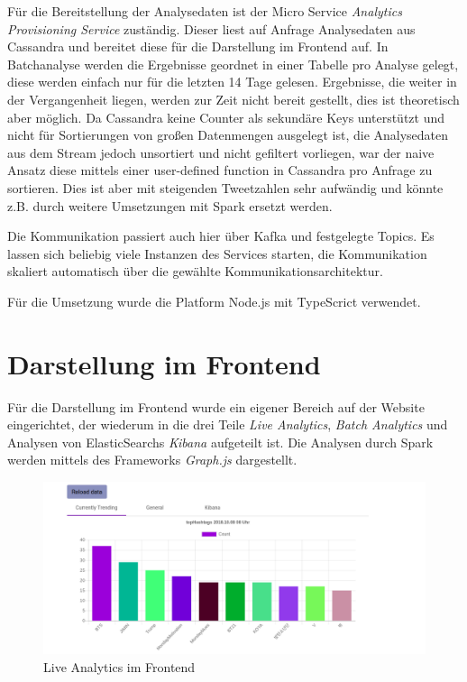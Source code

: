 Für die Bereitstellung der Analysedaten ist der Micro Service \textit{Analytics Provisioning Service} zuständig. 
Dieser liest auf Anfrage Analysedaten aus Cassandra und bereitet diese für die Darstellung im Frontend auf.
In Batchanalyse werden die Ergebnisse geordnet in einer Tabelle pro Analyse gelegt, diese werden einfach nur für die letzten 14 Tage gelesen. Ergebnisse, die weiter in der Vergangenheit liegen, werden zur Zeit nicht bereit gestellt, dies ist theoretisch aber möglich.
Da Cassandra keine Counter als sekundäre Keys unterstützt und nicht für Sortierungen von großen Datenmengen ausgelegt ist,
die Analysedaten aus dem Stream jedoch unsortiert und nicht gefiltert vorliegen, war der naive Ansatz diese mittels einer  user-defined function in Cassandra pro Anfrage zu sortieren. Dies ist aber mit steigenden Tweetzahlen sehr aufwändig und könnte z.B. durch weitere Umsetzungen mit Spark ersetzt werden.

Die Kommunikation passiert auch hier über Kafka und festgelegte Topics.
Es lassen sich beliebig viele Instanzen des Services starten, die Kommunikation skaliert automatisch über die gewählte Kommunikationsarchitektur.

Für die Umsetzung wurde die Platform Node.js mit TypeScrict verwendet. 


\section{Darstellung im Frontend}

Für die Darstellung im Frontend wurde ein eigener Bereich auf der Website eingerichtet, der wiederum in die drei Teile
\textit{Live Analytics}, \textit{Batch Analytics} und Analysen von ElasticSearchs \textit{Kibana} aufgeteilt ist.
Die Analysen durch Spark werden mittels des Frameworks \textit{Graph.js} dargestellt.



\begin{figure}[htbp!]
	\centering
	\includegraphics[width=1.1\textwidth]{pics/analytics/currentlyTrending}
	\caption{Live Analytics im Frontend}
\end{figure}
